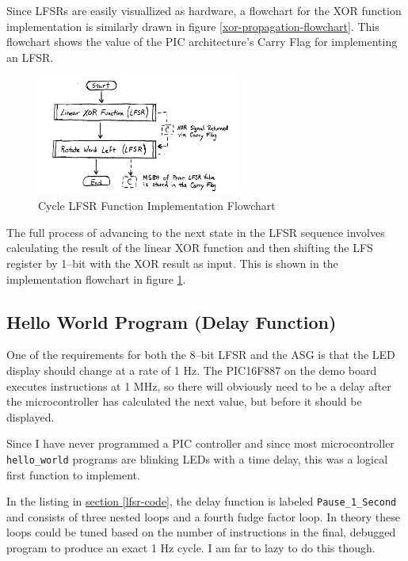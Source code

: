 \documentclass[11pt]{article}
\begin{document}
Since LFSRs are easily visuallized as hardware, a flowchart for the XOR function
implementation is similarly drawn in figure \ref{xor-propagation-flowchart}.
This flowchart shows the value of the PIC architecture's Carry Flag for implementing an LFSR.

\begin{figure}
	\centering
	\includegraphics[width=0.6\textwidth]{Figures/cycle-lfsr-flowchart.pdf}
	\caption{Cycle LFSR Function Implementation Flowchart}
	\label{cycle-lfsr-flowchart}
\end{figure}

The full process of advancing to the next state in the LFSR sequence involves
calculating the result of the linear XOR function and then shifting the LFS register
by 1--bit with the XOR result as input. This is shown in the implementation
flowchart in figure \ref{cycle-lfsr-flowchart}.

\subsection{Hello World Program (Delay Function)}

One of the requirements for both the 8--bit LFSR and the ASG is that
the LED display should change at a rate of 1 Hz. The PIC16F887 on
the demo board executes instructions at 1 MHz, so there will obviously
need to be a delay after the microcontroller has calculated the next
value, but before it should be displayed.

Since I have never programmed a PIC controller and since most 
microcontroller \texttt{hello\_world} programs are blinking LEDs with
a time delay, this was a logical first function to implement.

In the listing in \hyperref[lfsr-code]{section \ref{lfsr-code}},
the delay function is labeled \texttt{Pause\_1\_Second} and
consists of three nested loops and a fourth fudge factor loop.
In theory these loops could be tuned based on the number of instructions
in the final, debugged program to produce an exact 1 Hz cycle.
I am far to lazy to do this though.
\end{document}
